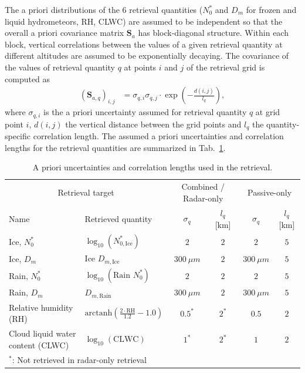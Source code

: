 \documentclass[journal abbreviation, manuscript]{copernicus}
\begin{document}
The a priori distributions of the 6 retrieval quantities ($N_0^*$ and $D_m$ for
frozen and liquid hydrometeors, RH, CLWC) are assumed to be independent so that
the overall a priori covariance matrix $\mathbf{S}_a$ has block-diagonal
structure. Within each block, vertical correlations between the values of a
given retrieval quantity at different altitudes are assumed to be exponentially
decaying. The covariance of the values of retrieval quantity $q$ at
points $i$ and $j$ of the retrieval grid is computed as
%
\begin{align}
\left ( \mathbf{S}_{a,q} \right )_{i, j} &= \sigma_{q,i} \sigma_{q,j}
 \cdot \exp  \left ( -\frac{d(i, j)}{l_q} \right ),
\end{align}
%
where $\sigma_{q, i}$ is the a priori uncertainty assumed for retrieval quantity
$q$ at grid point $i$, $d(i, j)$ the vertical distance between the grid points
and $l_q$ the quantity-specific correlation length. The assumed a priori
uncertainties and correlation lengths for the retrieval quantities are
summarized in Tab.~\ref{tab:a_priori}.

\begin{table}[h!]
\caption{A priori uncertainties and correlation
 lengths used in the retrieval.}
 \centering
\label{tab:a_priori}
    \begin{tabular}{ll|cc|cc|}
      \multicolumn{2}{c|}{Retrieval target}  & \multicolumn{2}{c|}{Combined / Radar-only} & \multicolumn{2}{c}{Passive-only}\\
      Name & Retrieved quantity &  $\sigma_q$ & $l_q$ [km] & $\sigma_q$ & $l_q$ [km]\\
    \hline
Ice, $N_0^*$ & $\log_{10}(N_{0, \text{Ice}}^*)$ & $2$ & $2$ & $2$ &$5$ \\
Ice, $D_m$ &   $\text{Ice }D_{m, \text{Ice}}$   & $300\ \unit{\mu m}$  & $2$ & $300\ \unit{\mu m}$          & $5$ \\
Rain, $N_0^*$ &    $\log_{10}(\text{Rain } N_{0}^*)$ & $2$ & $2$ & $2$ &$5$ \\
Rain, $D_m$ &  $D_{m, \text{Rain}}$   & $300\ \unit{\mu m}$  & $2$ & $300\ \unit{\mu m}$          & $5$ \\
Relative humidity (RH) & $\text{arctanh}(\frac{2 \cdot \text{RH}}{1.2} - 1.0)$ & $0.5^{*}$ & $2^{*}$ & $0.5$ & $2$ \\
Cloud liquid water content (CLWC) & $\log_{10}(\text{CLWC}) $ & $1^{*}$ & $2^{*}$  & $1$ & $2$ \\
\multicolumn{6}{l}{$^*$: Not retrieved in radar-only retrieval}
    \end{tabular}
\end{table}
\end{document}

